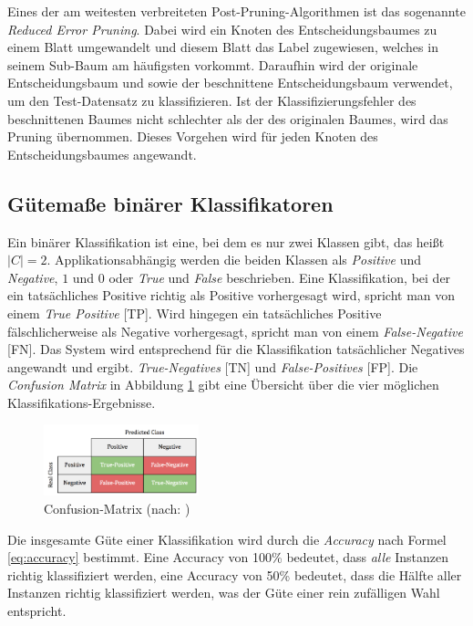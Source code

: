 Eines der am weitesten verbreiteten Post-Pruning-Algorithmen ist das sogenannte \emph{Reduced Error Pruning}. Dabei wird ein Knoten des Entscheidungsbaumes zu einem Blatt umgewandelt und diesem Blatt das Label zugewiesen, welches in seinem Sub-Baum am häufigsten vorkommt. Daraufhin wird der originale Entscheidungsbaum und sowie der beschnittene Entscheidungsbaum verwendet, um den Test-Datensatz zu klassifizieren. Ist der Klassifizierungsfehler des beschnittenen Baumes nicht schlechter als der des originalen Baumes, wird das Pruning übernommen. Dieses Vorgehen wird für jeden Knoten des Entscheidungsbaumes angewandt.

\subsection{Gütemaße binärer Klassifikatoren}

Ein binärer Klassifikation ist eine, bei dem es nur zwei Klassen gibt, das heißt $|C| = 2$. Applikationsabhängig werden die beiden Klassen als \emph{Positive} und \emph{Negative}, $1$ und $0$ oder \emph{True} und \emph{False} beschrieben. Eine Klassifikation, bei der ein tatsächliches Positive richtig als Positive vorhergesagt wird, spricht man von einem \emph{True Positive} [TP]. Wird hingegen ein tatsächliches Positive fälschlicherweise als Negative vorhergesagt, spricht man von einem \emph{False-Negative} [FN]. Das System wird entsprechend für die Klassifikation tatsächlicher Negatives angewandt und ergibt. \emph{True-Negatives} [TN] und \emph{False-Positives} [FP]. Die \emph{Confusion Matrix} in Abbildung \ref{img:Confusion-Matrix} gibt eine Übersicht über die vier möglichen Klassifikations-Ergebnisse. \cite[S. 213 - 214]{machine_kubat}

\begin{figure}[h]
	\centering
	\includegraphics[width=0.4\textwidth]{bilder/Confusion-Matrix02.png}
	\caption{Confusion-Matrix (nach: \cite[S. 214]{machine_kubat})}
	\label{img:Confusion-Matrix}
\end{figure}

Die insgesamte Güte einer Klassifikation wird durch die \emph{Accuracy} nach Formel \ref{eq:accuracy} bestimmt. Eine Accuracy von 100\% bedeutet, dass \emph{alle} Instanzen richtig klassifiziert werden, eine Accuracy von 50\% bedeutet, dass die Hälfte aller Instanzen richtig klassifiziert werden, was der Güte einer rein zufälligen Wahl entspricht. \cite[S. 214]{machine_kubat}

